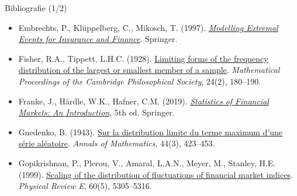 \begin{frame}{Bibliografie (1/2)}
\begin{itemize}
    \item Embrechts, P., Klüppelberg, C., Mikosch, T. (1997). \href{https://doi.org/10.1007/978-3-642-33483-2}{\textit{Modelling Extremal Events for Insurance and Finance}}. Springer.
    \item Fisher, R.A., Tippett, L.H.C. (1928). \href{https://doi.org/10.1017/S0305004100015681}{Limiting forms of the frequency distribution of the largest or smallest member of a sample}. \textit{Mathematical Proceedings of the Cambridge Philosophical Society}, 24(2), 180--190.
    \item Franke, J., Härdle, W.K., Hafner, C.M. (2019). \href{https://doi.org/10.1007/978-3-030-13751-9}{\textit{Statistics of Financial Markets: An Introduction}}, 5th ed. Springer.
    \item Gnedenko, B. (1943). \href{https://doi.org/10.2307/1968974}{Sur la distribution limite du terme maximum d'une série aléatoire}. \textit{Annals of Mathematics}, 44(3), 423--453.
    \item Gopikrishnan, P., Plerou, V., Amaral, L.A.N., Meyer, M., Stanley, H.E. (1999). \href{https://doi.org/10.1103/PhysRevE.60.5305}{Scaling of the distribution of fluctuations of financial market indices}. \textit{Physical Review E}, 60(5), 5305--5316.
\end{itemize}
\end{frame}

